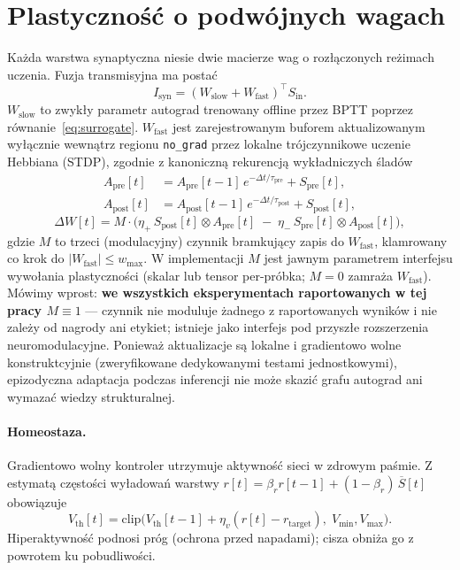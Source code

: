 \documentclass[11pt]{article}
\newcommand{\Wslow}{W_{\text{slow}}}
\newcommand{\Wfast}{W_{\text{fast}}}
\begin{document}
\section{Plastyczność o podwójnych wagach}
Każda warstwa synaptyczna niesie dwie macierze wag o rozłączonych reżimach
uczenia. Fuzja transmisyjna ma postać
\begin{equation}
I_{\text{syn}} = (\Wslow + \Wfast)^{\!\top} S_{\text{in}} .
\end{equation}
$\Wslow$ to zwykły parametr autograd trenowany offline przez BPTT poprzez
równanie~\eqref{eq:surrogate}. $\Wfast$ jest zarejestrowanym buforem
aktualizowanym wyłącznie wewnątrz regionu \texttt{no\_grad} przez lokalne
trójczynnikowe uczenie Hebbiana (STDP), zgodnie z kanoniczną rekurencją
wykładniczych śladów
\begin{align}
A_{\text{pre}}[t] &= A_{\text{pre}}[t-1]\,e^{-\Delta t/\tau_{\text{pre}}}
   + S_{\text{pre}}[t], \\
A_{\text{post}}[t] &= A_{\text{post}}[t-1]\,e^{-\Delta t/\tau_{\text{post}}}
   + S_{\text{post}}[t],
\end{align}
\begin{equation}
\Delta W[t] = M\cdot\Big(\eta_+\, S_{\text{post}}[t] \otimes A_{\text{pre}}[t]
   \;-\; \eta_-\, S_{\text{pre}}[t] \otimes A_{\text{post}}[t]\Big),
\label{eq:stdp}
\end{equation}
gdzie $M$ to trzeci (modulacyjny) czynnik bramkujący zapis do $\Wfast$,
klamrowany co krok do $|{\Wfast}|\le w_{\max}$. W implementacji $M$ jest
jawnym parametrem interfejsu wywołania plastyczności (skalar lub tensor
per-próbka; $M=0$ zamraża $\Wfast$). Mówimy wprost: \textbf{we wszystkich
eksperymentach raportowanych w tej pracy $M \equiv 1$} --- czynnik nie
moduluje żadnego z raportowanych wyników i nie zależy od nagrody ani etykiet;
istnieje jako interfejs pod przyszłe rozszerzenia neuromodulacyjne. Ponieważ
aktualizacje są
lokalne i gradientowo wolne konstruktcyjnie (zweryfikowane dedykowanymi
testami jednostkowymi), epizodyczna adaptacja podczas inferencji nie może
skazić grafu autograd ani wymazać wiedzy strukturalnej.

\paragraph{Homeostaza.} Gradientowo wolny kontroler utrzymuje aktywność sieci
w zdrowym paśmie. Z estymatą częstości wyładowań warstwy
$r[t]=\beta_r r[t-1] + (1-\beta_r)\,\overline{S}[t]$ obowiązuje
\begin{equation}
V_{\text{th}}[t] = \mathrm{clip}\big(V_{\text{th}}[t-1]
   + \eta_v (r[t] - r_{\text{target}}),\; V_{\min}, V_{\max}\big).
\end{equation}
Hiperaktywność podnosi próg (ochrona przed napadami); cisza obniża go z
powrotem ku pobudliwości.
\end{document}
